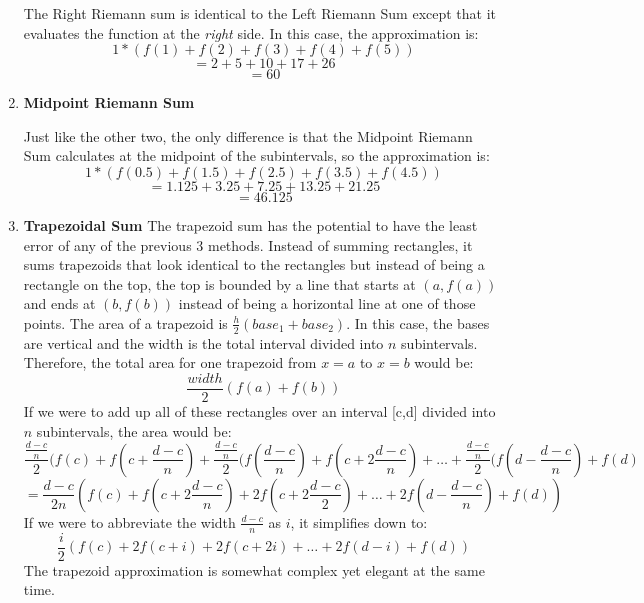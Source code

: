 \documentclass[../revisedmain.tex]{subfiles}
\begin{document}
\begin{enumerate}
\begin{center}
\begin{tikzpicture}
			\end{tikzpicture}
		\end{center}
		The Right Riemann sum is identical to the Left Riemann Sum except that it evaluates the function at the \textit{right} side. In this case, the approximation is:$$1*(f(1)+f(2)+f(3)+f(4)+f(5))$$$$=2+5+10+17+26$$$$=60$$
	\item \textbf{Midpoint Riemann Sum}
		\begin{center}
		\end{center}
		Just like the other two, the only difference is that the Midpoint Riemann Sum calculates at the midpoint of the subintervals, so the approximation is:$$1*(f(0.5)+f(1.5)+f(2.5)+f(3.5)+f(4.5))$$$$=1.125+3.25+7.25+13.25+21.25$$$$=46.125$$		
	\item \textbf{Trapezoidal Sum}
	The trapezoid sum has the potential to have the least error of any of the previous 3 methods. Instead of summing rectangles, it sums trapezoids that look identical to the rectangles but instead of being a rectangle on the top, the top is bounded by a line that starts at $(a,f(a))$ and ends at $(b,f(b))$ instead of being a horizontal line at one of those points. The area of a trapezoid is $\displaystyle\frac{h}{2} (base_1+base_2)$. In this case, the bases are vertical and the width is the total interval divided into $n$ subintervals. Therefore, the total area for one trapezoid from $x=a$ to $x=b$ would be:$$\frac{width}{2} (f(a)+f(b))$$ If we were to add up all of these rectangles over an interval [c,d] divided into $n$ subintervals, the area would be:$$\frac{\frac{d-c}{n}}{2} (f(c)+f(c+\frac{d-c}{n})+\frac{\frac{d-c}{n}}{2} (f(\frac{d-c}{n})+f(c+2\frac{d-c}{n})+\dots+\frac{\frac{d-c}{n}}{2} (f(d-\frac{d-c}{n})+f(d)$$$$=\frac{d-c}{2n}\left(f(c)+f(c+2\frac{d-c}{n})+2f(c+2\frac{d-c}{2})+\dots+2f(d-\frac{d-c}{n})+f(d)\right)$$If we were to abbreviate the width $\displaystyle\frac{d-c}{n}$ as $i$, it simplifies down to:$$\frac{i}{2}\left(f(c)+2f(c+i)+2f(c+2i)+\dots+2f(d-i)+f(d)\right)$$The trapezoid approximation is somewhat complex yet elegant at the same time.
\end{enumerate}
\end{document}
